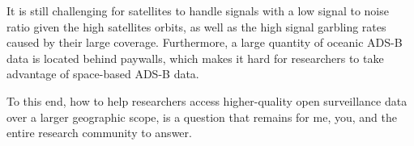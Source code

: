 It is still challenging for satellites to handle signals with a low signal to noise ratio given the high satellites orbits, as well as the high signal garbling rates caused by their large coverage. Furthermore, a large quantity of oceanic ADS-B data is located behind paywalls, which makes it hard for researchers to take advantage of space-based ADS-B data. 

To this end, how to help researchers access higher-quality open surveillance data over a larger geographic scope, is a question that remains for me, you, and the entire research community to answer.